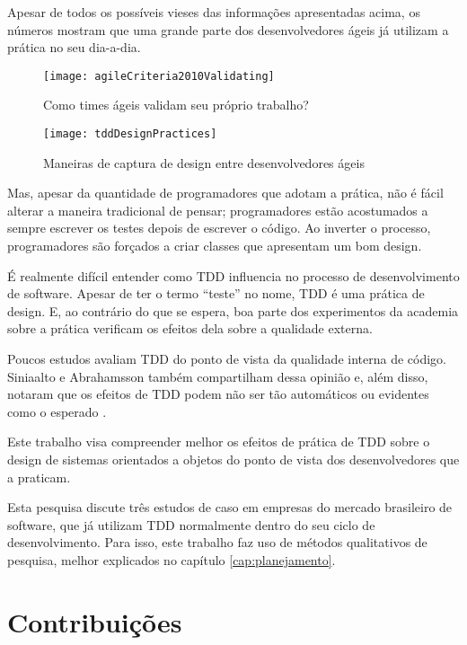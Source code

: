 Apesar de todos os possíveis vieses das informações apresentadas acima, os
números mostram que uma grande parte dos desenvolvedores ágeis já utilizam a 
prática no seu dia-a-dia.

\begin{figure}[h]
  \centering
  \texttt{[image: agileCriteria2010Validating]}
  \caption{Como times ágeis validam seu próprio trabalho?}
  \label{fig:wambler-agile-2010}
\end{figure}

\begin{figure}[h]
  \centering
  \texttt{[image: tddDesignPractices]}
  \caption{Maneiras de captura de design entre desenvolvedores ágeis}   
  \label{fig:wambler-tdd-2008}
\end{figure}

Mas, apesar da quantidade de programadores que adotam a prática, não é
fácil alterar a maneira tradicional de pensar; programadores estão acostumados a
sempre escrever os testes depois de escrever o código. Ao inverter o processo,
programadores são forçados a criar classes que apresentam um bom design.

É realmente difícil entender como TDD influencia no processo de desenvolvimento
de software. Apesar de ter o termo ``teste'' no nome, TDD é uma prática
de design. E, ao contrário do que se espera, boa parte dos experimentos da
academia sobre a prática verificam os efeitos dela sobre a qualidade externa. 

Poucos estudos avaliam TDD do ponto de vista da qualidade interna de código.
Siniaalto e Abrahamsson também compartilham dessa opinião e, além disso, notaram
que os efeitos de TDD podem não ser tão automáticos ou evidentes como o 
esperado \cite{alarming-results}.

Este trabalho visa compreender melhor os efeitos de prática de TDD sobre o
design de sistemas orientados a objetos do ponto de vista dos desenvolvedores
que a praticam. 

Esta pesquisa discute três estudos de caso em empresas do mercado brasileiro de
software, que já utilizam TDD normalmente dentro do seu ciclo de
desenvolvimento. Para isso, este trabalho faz uso de métodos qualitativos de
pesquisa, melhor explicados no capítulo \ref{cap:planejamento}.

\section{Contribuições}

